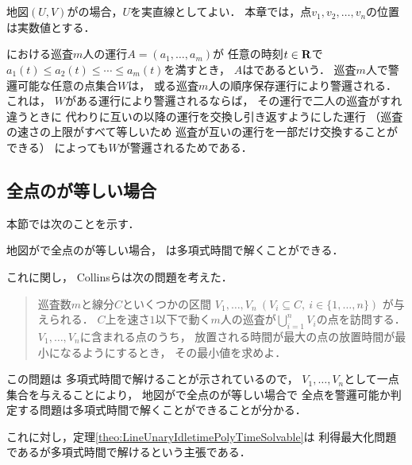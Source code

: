 \chapter{{\graphLine}}
\label{chapter: line}

地図$(U, V)$が{\graphLine}の場合，$U$を実直線としてよい．
本章では，点$v_1, v_2, \ldots, v_n$の位置は実数値とする．

{\graphLine}における巡査$m$人の運行$A = (a_1, \ldots, a_m)$が
任意の時刻$t \in \mathbf R$で
$a_1(t) \leq a_2(t) \leq \cdots \leq a_m(t)$を満すとき，
$A$はであるという．
巡査$m$人で警邏可能な任意の点集合$W$は，
或る巡査$m$人の順序保存運行により警邏される．
これは，
$W$がある運行により警邏されるならば，
その運行で二人の巡査がすれ違うときに
代わりに互いの以降の運行を交換し引き返すようにした運行
（巡査の速さの上限がすべて等しいため
巡査が互いの運行を一部だけ交換することができる）
によっても$W$が警邏されるためである．


\section{全点の{\maxIdletime}が等しい場合}
\label{section:LineUnaryIdletime}


本節では次のことを示す．

\begin{theo}
  \label{theo:LineUnaryIdletimePolyTimeSolvable}
  地図が{\graphLine}で全点の{\maxIdletime}が等しい場合，
  {\patProb}は多項式時間で解くことができる．
\end{theo}

これに関し，
Collinsら\cite{collins2013optimal}は次の問題を考えた．
\begin{quote}
  巡査数$m$と線分$C$といくつかの区間
  $V_1, \ldots, V_n\ (V_i \subseteq C,\ i \in \{1,\ldots, n\})$%
  が与えられる．
  $C$上を速さ$1$以下で動く$m$人の巡査が$\bigcup_{i = 1}^n V_i$の点を訪問する．
  $V_1, \ldots, V_n$に含まれる点のうち，
  放置される時間が最大の点の放置時間が最小になるようにするとき，
  その最小値を求めよ．
\end{quote}
この問題は
多項式時間で解けることが示されている\cite[Theorem~2.1]{collins2013optimal}ので，
$V_1, \ldots, V_n$として一点集合を与えることにより，
地図が{\graphLine}で全点の{\maxIdletime}が等しい場合で
全点を警邏可能か判定する問題は多項式時間で解くことができることが分かる．

これに対し，定理\ref{theo:LineUnaryIdletimePolyTimeSolvable}は
利得最大化問題である{\patProb}が多項式時間で解けるという主張である．

